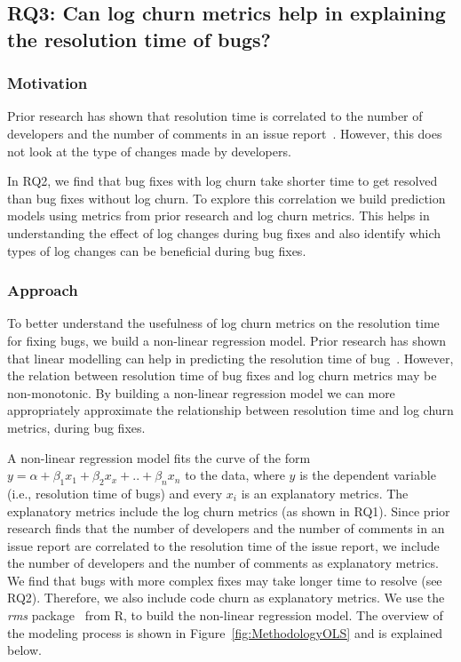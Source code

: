 \subsection* {\textbf{RQ3: Can log churn metrics help in explaining the resolution time of bugs?} }

\subsubsection*{\textbf{Motivation}}
Prior research has shown that resolution time is correlated to the number of developers and the number of comments in an issue report~\cite{RTpredictions}. However, this does not look at the type of changes made by developers. 

In RQ2, we find that bug fixes with log churn take shorter time to get resolved than bug fixes without log churn. To explore this correlation we build prediction models using metrics from prior research and log churn metrics. This helps in understanding the effect of log changes during bug fixes and also identify which types of log changes can be beneficial during bug fixes. 

\subsubsection*{\textbf{Approach}}

To better understand the usefulness of log churn metrics on the resolution time for fixing bugs, we build a non-linear regression model. Prior research has shown that linear modelling can help in predicting the resolution time of bug~\cite{anbalagan2009predicting}. However, the relation between resolution time of bug fixes and log churn metrics may be non-monotonic. By building a non-linear regression model we can more appropriately approximate the relationship between resolution time and log churn metrics, during bug fixes.

  A non-linear regression model fits the curve of the form $y = \alpha + \beta_{1}x_{1} + \beta_{2}x_{x} + .. + \beta_{n}x_{n} $ to the data, where $y$ is the dependent variable (i.e., resolution time of bugs) and every $x_{i}$ is an explanatory metrics. The explanatory metrics include the log churn metrics (as shown in RQ1). Since prior research finds that the number of developers and the number of comments in an issue report are correlated to the resolution time of the issue report, we include the number of developers and the number of comments as explanatory metrics. We find that bugs with more complex fixes may take longer time to resolve (see RQ2). Therefore, we also include code churn as explanatory metrics. We use the \textsl{rms} package~\cite{rmsPackage} from R, to build the non-linear regression model. The overview of the modeling process is shown in Figure~\ref{fig:MethodologyOLS} and is explained below.




